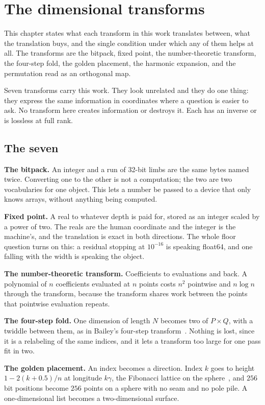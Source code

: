 \chapter{The dimensional transforms}

This chapter states what each transform in this work translates between, what the translation buys, and the single condition under which any of them helps at all. The transforms are the bitpack, fixed point, the number-theoretic transform, the four-step fold, the golden placement, the harmonic expansion, and the permutation read as an orthogonal map.

Seven transforms carry this work. They look unrelated and they do one thing: they express the same information in coordinates where a question is easier to ask. No transform here creates information or destroys it. Each has an inverse or is lossless at full rank.

\section{The seven}

\textbf{The bitpack.} An integer and a run of 32-bit limbs are the same bytes named twice. Converting one to the other is not a computation; the two are two vocabularies for one object. This lets a number be passed to a device that only knows arrays, without anything being computed.

\textbf{Fixed point.} A real to whatever depth is paid for, stored as an integer scaled by a power of two. The reals are the human coordinate and the integer is the machine's, and the translation is exact in both directions. The whole floor question turns on this: a residual stopping at \(10^{-16}\) is speaking float64, and one falling with the width is speaking the object.

\textbf{The number-theoretic transform.} Coefficients to evaluations and back. A polynomial of \(n\) coefficients evaluated at \(n\) points costs \(n^2\) pointwise and \(n \log n\) through the transform, because the transform shares work between the points that pointwise evaluation repeats.

\textbf{The four-step fold.} One dimension of length \(N\) becomes two of \(P \times Q\), with a twiddle between them, as in Bailey's four-step transform~\cite{src:Bailey-1990}. Nothing is lost, since it is a relabeling of the same indices, and it lets a transform too large for one pass fit in two.

\textbf{The golden placement.} An index becomes a direction. Index \(k\) goes to height \(1 - 2(k + 0.5)/n\) at longitude \(k\gamma\), the Fibonacci lattice on the sphere~\cite{src:Gonzalez-2010}, and \(256\) bit positions become \(256\) points on a sphere with no seam and no pole pile. A one-dimensional list becomes a two-dimensional surface.

